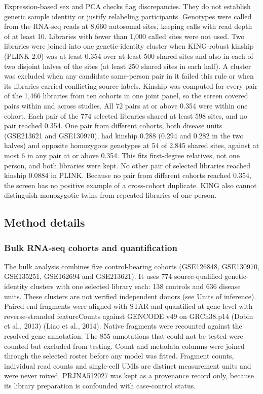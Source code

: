 Expression-based sex and PCA checks flag discrepancies. They do not establish genetic sample identity or justify relabeling participants. Genotypes were called from the RNA-seq reads at 8,660 autosomal sites, keeping calls with read depth of at least 10. Libraries with fewer than 1,000 called sites were not used. Two libraries were joined into one genetic-identity cluster when KING-robust kinship (PLINK 2.0) was at least 0.354 over at least 500 shared sites and also in each of two disjoint halves of the sites (at least 250 shared sites in each half). A cluster was excluded when any candidate same-person pair in it failed this rule or when its libraries carried conflicting source labels. Kinship was computed for every pair of the 1,466 libraries from ten cohorts in one joint panel, so the screen covered pairs within and across studies. All 72 pairs at or above 0.354 were within one cohort. Each pair of the 774 selected libraries shared at least 598 sites, and no pair reached 0.354. One pair from different cohorts, both disease units (GSE213621 and GSE130970), had kinship 0.288 (0.294 and 0.282 in the two halves) and opposite homozygous genotypes at 54 of 2,845 shared sites, against at most 6 in any pair at or above 0.354. This fits first-degree relatives, not one person, and both libraries were kept. No other pair of selected libraries reached kinship 0.0884 in PLINK. Because no pair from different cohorts reached 0.354, the screen has no positive example of a cross-cohort duplicate. KING also cannot distinguish monozygotic twins from repeated libraries of one person.

\subsection{Method details}\label{method-details}

\subsubsection{Bulk RNA-seq cohorts and quantification}\label{bulk-rna-seq-cohorts-and-quantification}

The bulk analysis combines five control-bearing cohorts (GSE126848, GSE130970, GSE135251, GSE162694 and GSE213621). It uses 774 source-qualified genetic-identity clusters with one selected library each: 138 controls and 636 disease units. These clusters are not verified independent donors (see Units of inference). Paired-end fragments were aligned with STAR and quantified at gene level with reverse-stranded featureCounts against GENCODE v49 on GRCh38.p14 (Dobin et al., 2013) (Liao et al., 2014). Native fragments were recounted against the resolved gene annotation. The 855 annotations that could not be tested were counted but excluded from testing. Count and metadata columns were joined through the selected roster before any model was fitted. Fragment counts, individual read counts and single-cell UMIs are distinct measurement units and were never mixed. PRJNA512027 was kept as a provenance record only, because its library preparation is confounded with case-control status.

